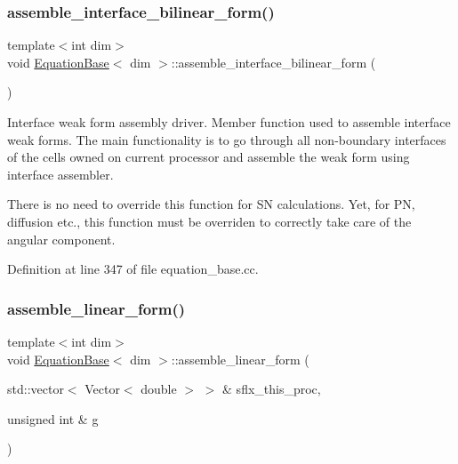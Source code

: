 \subsubsection{\texorpdfstring{assemble\+\_\+interface\+\_\+bilinear\+\_\+form()}{assemble\_interface\_bilinear\_form()}}
{\footnotesize\ttfamily template$<$int dim$>$ \\
void \hyperlink{class_equation_base}{Equation\+Base}$<$ dim $>$\+::assemble\+\_\+interface\+\_\+bilinear\+\_\+form (\begin{DoxyParamCaption}{ }\end{DoxyParamCaption})\hspace{0.3cm}{\ttfamily [virtual]}}



Interface weak form assembly driver. Member function used to assemble interface weak forms. The main functionality is to go through all non-\/boundary interfaces of the cells owned on current processor and assemble the weak form using interface assembler. 

There is no need to override this function for SN calculations. Yet, for PN, diffusion etc., this function must be overriden to correctly take care of the angular component. 

Definition at line 347 of file equation\+\_\+base.\+cc.

\mbox{\label{class_equation_base_ac08c0b8c03ccd29f0b9eb49f6e63f8e9}} 
\subsubsection{\texorpdfstring{assemble\+\_\+linear\+\_\+form()}{assemble\_linear\_form()}}
{\footnotesize\ttfamily template$<$int dim$>$ \\
void \hyperlink{class_equation_base}{Equation\+Base}$<$ dim $>$\+::assemble\+\_\+linear\+\_\+form (\begin{DoxyParamCaption}\item[{std\+::vector$<$ Vector$<$ double $>$ $>$ \&}]{sflx\+\_\+this\+\_\+proc,  }\item[{unsigned int \&}]{g }\end{DoxyParamCaption})\hspace{0.3cm}{\ttfamily [virtual]}}



